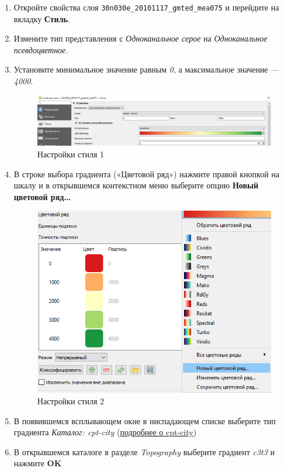\documentclass[
  12pt,
]{book}
\begin{document}
\begin{enumerate}
\def\labelenumi{\arabic{enumi}.}
\item
  Откройте свойства слоя \texttt{30n030e\_20101117\_gmted\_mea075} и перейдите на вкладку \textbf{Стиль}.
\item
  Измените тип представления с \emph{Одноканальное серое} на \emph{Одноканальное псевдоцветное}.
\item
  Установите минимальное значение равным \emph{0}, а максимальное значение --- \emph{4000}.

  \begin{figure}
  \centering
  \includegraphics{images/Ex01/style1.png}
  \caption{Настройки стиля 1}
  \end{figure}
\item
  В строке выбора градиента («Цветовой ряд») нажмите правой кнопкой на шкалу и в открывшемся контекстном меню выберите опцию \textbf{Новый цветовой ряд\ldots{}}

  \begin{figure}
  \centering
  \includegraphics{images/Ex01/style2.png}
  \caption{Настройки стиля 2}
  \end{figure}
\item
  В появившемся всплывающем окне в ниспадающем списке выберите тип градиента \emph{Каталог: cpt-city} (\href{http://soliton.vm.bytemark.co.uk/pub/cpt-city/}{подробнее о cpt-city})
\item
  В открывшемся каталоге в разделе \emph{Topography} выберите градиент \emph{c3t3} и нажмите \textbf{OK}


\end{enumerate}
\end{document}
